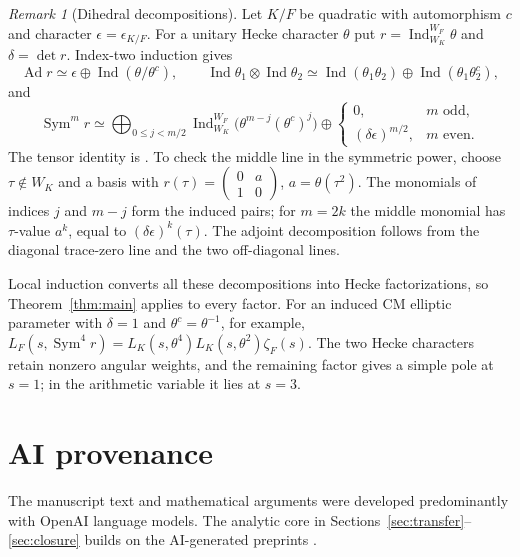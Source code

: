 \documentclass[11pt,a4paper]{article}
\numberwithin{equation}{section}
\theoremstyle{definition}
\theoremstyle{remark}
\newtheorem{remark}[theorem]{Remark}
\begin{document}
\begin{remark}[Dihedral decompositions]\label{subsec:dihedral}\label{prop:dihedral}
Let $K/F$ be quadratic with automorphism $c$ and character
$\epsilon=\epsilon_{K/F}$. For a unitary Hecke character $\theta$ put
$r=\operatorname{Ind}_{W_K}^{W_F}\theta$ and $\delta=\det r$.
Index-two induction gives
\[
 \operatorname{Ad}r\simeq\epsilon\oplus
        \operatorname{Ind}(\theta/\theta^c),\qquad
 \operatorname{Ind}\theta_1\otimes\operatorname{Ind}\theta_2
 \simeq\operatorname{Ind}(\theta_1\theta_2)
          \oplus\operatorname{Ind}(\theta_1\theta_2^c),
\]
and
\begin{equation}\label{eq:dihedral-symmetric}
 \operatorname{Sym}^m r\simeq
 \bigoplus_{0\le j<m/2}
       \operatorname{Ind}_{W_K}^{W_F}
             \bigl(\theta^{m-j}(\theta^c)^j\bigr)
 \oplus
 \begin{cases}
   0,&m\text{ odd},\\
   (\delta\epsilon)^{m/2},&m\text{ even}.
 \end{cases}
\end{equation}
The tensor identity is \cite[Lemma~2.3]{Langlands}. To check the middle
line in the symmetric power, choose $\tau\notin W_K$ and a basis with
$r(\tau)=\left(\begin{smallmatrix}0&a\\1&0\end{smallmatrix}\right)$,
$a=\theta(\tau^2)$. The monomials of indices $j$ and $m-j$ form the
induced pairs; for $m=2k$ the middle monomial has $\tau$-value $a^k$,
equal to $(\delta\epsilon)^k(\tau)$. The adjoint decomposition follows
from the diagonal trace-zero line and the two off-diagonal lines.

Local induction converts all these decompositions into Hecke
factorizations, so Theorem~\ref{thm:main} applies to every factor.
For an induced CM elliptic parameter with $\delta=1$ and
$\theta^c=\theta^{-1}$, for example,
$L_F(s,\operatorname{Sym}^4r)=
L_K(s,\theta^4)L_K(s,\theta^2)\zeta_F(s)$.
The two Hecke characters retain nonzero angular weights, and the
remaining factor gives a simple pole at $s=1$; in the arithmetic
variable it lies at $s=3$.
\end{remark}

\section*{AI provenance}
The manuscript text and mathematical arguments were developed predominantly
with OpenAI language models. The analytic core in
Sections~\ref{sec:transfer}--\ref{sec:closure} builds on the AI-generated
preprints \cite{Q,P}.
\end{document}
